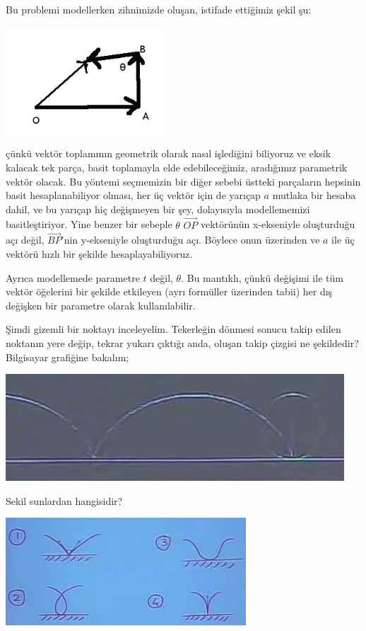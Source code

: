 \documentclass[12pt,fleqn]{article}\usepackage{../../common}
\begin{document}
Bu problemi modellerken zihnimizde oluşan, istifade ettiğimiz şekil şu:

\includegraphics[height=4cm]{cycloid-lines.png}

çünkü vektör toplamının geometrik olarak nasıl işlediğini biliyoruz ve eksik
kalacak tek parça, basit toplamayla elde edebileceğimiz, aradığımız parametrik
vektör olacak. Bu yöntemi seçmemizin bir diğer sebebi üstteki parçaların
hepsinin basit hesaplanabiliyor olması, her üç vektör için de yarıçap $a$
mutlaka bir hesaba dahil, ve bu yarıçap hiç değişmeyen bir şey, dolayısıyla
modellememizi basitleştiriyor. Yine benzer bir sebeple $\theta$ $\vec{OP}$
vektörünün x-ekseniyle oluşturduğu açı değil, $\vec{BP}$'nin y-ekseniyle
oluşturduğu açı. Böylece onun üzerinden ve $a$ ile üç vektörü hızlı bir şekilde
hesaplayabiliyoruz.

Ayrıca modellemede parametre $t$ değil, $\theta$. Bu mantıklı, çünkü değişimi
ile tüm vektör öğelerini bir şekilde etkileyen (ayrı formüller üzerinden tabii)
her dış değişken bir parametre olarak kullanılabilir.

Şimdi gizemli bir noktayı inceleyelim. Tekerleğin dönmesi sonucu takip edilen
noktanın yere değip, tekrar yukarı çıktığı anda, oluşan takip çizgisi ne
şekildedir? Bilgisayar grafiğine bakalım;

\includegraphics[height=4cm]{5_7.png}

Sekil sunlardan hangisidir? 

\includegraphics[height=4cm]{5_8.png}
\end{document}
